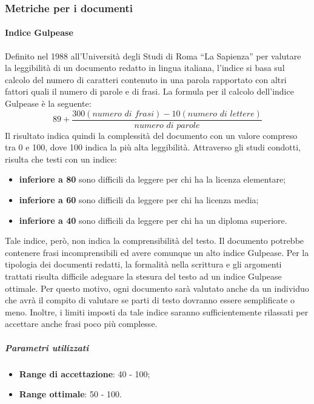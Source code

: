 \documentclass[../PianoDiQualifica.tex]{subfiles}
\begin{document}
			\subsubsection{Metriche per i documenti}
				\paragraph{Indice Gulpease\\}
					Definito nel 1988 all'Università degli Studi di Roma ``La
					Sapienza'' per valutare la leggibilità di un documento redatto in
					lingua italiana, l'indice  si basa sul calcolo del
					numero di caratteri contenuto in una parola rapportato con altri
					fattori quali il numero di parole e di frasi.
					La formula per il calcolo dell'indice Gulpease è la seguente:
					\begin{equation*}
						89+\frac{300\left(\textit{numero di frasi}\right)-10\left(\textit{numero di lettere}\right)}{\textit{numero di parole}}
					\end{equation*}
					Il risultato indica	quindi la complessità del documento con un
					valore compreso tra 0 e 100, dove 100 indica la più alta
					leggibilità. Attraverso gli studi condotti,	risulta che testi con
					un indice:
					\begin{itemize}
						\item \textbf{inferiore a 80} sono difficili da leggere per chi
						ha la licenza elementare;
						\item \textbf{inferiore a 60} sono difficili da leggere per chi
						ha licenza media;
						\item \textbf{inferiore a 40} sono difficili da leggere per chi
						ha un diploma superiore.
					\end{itemize}
					Tale indice, però, non indica la comprensibilità del testo. Il
					documento potrebbe contenere frasi incomprensibili ed avere comunque
					un alto indice Gulpease. Per la tipologia dei documenti redatti, la
					formalità nella scrittura e gli argomenti trattati risulta difficile
					adeguare la stesura del testo ad un indice Gulpease ottimale. Per
					questo motivo, ogni documento sarà valutato anche da un individuo
					che avrà il compito di valutare se parti di testo dovranno essere
					semplificate o meno. Inoltre, i limiti imposti da tale indice
					saranno sufficientemente rilassati per accettare anche frasi poco
					più complesse.
					\subparagraph{Parametri utilizzati}
						\begin{itemize}
							\item \textbf{Range di accettazione}: 40 - 100;
							\item \textbf{Range ottimale}: 50 - 100.
						\end{itemize}
\end{document}
